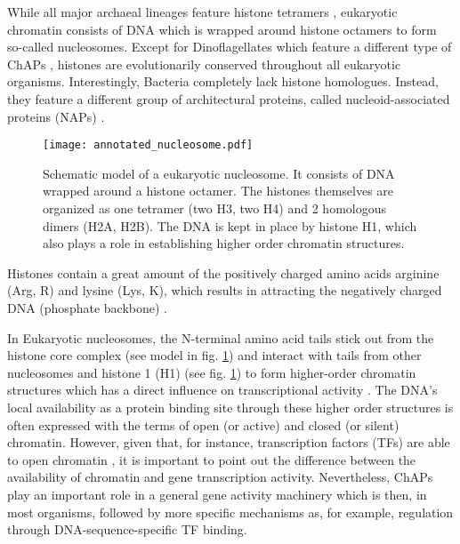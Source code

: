         While all major archaeal lineages feature histone tetramers \cite{slesarev1998evidence}, eukaryotic chromatin consists of DNA which is wrapped around histone octamers to form so-called nucleosomes. Except for Dinoflagellates which feature a different type of ChAPs \cite{de2005organization}, histones are evolutionarily conserved throughout all eukaryotic organisms. Interestingly, Bacteria completely lack histone homologues. Instead, they feature a different group of architectural proteins, called nucleoid-associated proteins (NAPs) \cite{qin2019architects}.

        \begin{figure}[htpb!]
            \centering
            \texttt{[image: annotated\_nucleosome.pdf]}
            \caption{Schematic model of a eukaryotic nucleosome. It consists of DNA wrapped around a histone octamer. The histones themselves are organized as one tetramer (two H3, two H4) and 2 homologous dimers (H2A, H2B). The DNA is kept in place by histone H1, which also plays a role in establishing higher order chromatin structures.}
            \label{img:nucleosome}
        \end{figure}

        Histones contain a great amount of the positively charged amino acids arginine (Arg, R) and lysine (Lys, K), which results in attracting the negatively charged DNA (phosphate backbone) \cite{berg2015stryer}.

        In Eukaryotic nucleosomes, the N-terminal amino acid tails stick out from the histone core complex (see model in fig. \ref{img:nucleosome}) and interact with tails from other nucleosomes and histone 1 (H1) (see fig. \ref{img:nucleosome}) to form higher-order chromatin structures which has a direct influence on transcriptional activity \cite{prohaska2010innovation}. The DNA's local availability as a protein binding site through these higher order structures is often expressed with the terms of open (or active) and closed (or silent) chromatin. However, given that, for instance, transcription factors (TFs) are able to open chromatin \cite{lomvardas2002opening}, it is important to point out the difference between the availability of chromatin and gene transcription activity. Nevertheless, ChAPs play an important role in a general gene activity machinery which is then, in most organisms, followed by more specific mechanisms as, for example, regulation through DNA-sequence-specific TF binding.
